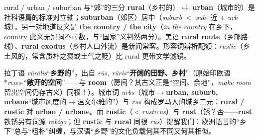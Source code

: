 \documentclass[../main.tex]{subfiles}
\begin{document}


\begin{gram}{rural / urban / suburban 与“郊”的三分}
\textbf{rural}（乡村的）$\leftrightarrow$ \textbf{urban}（城市的）是社科语篇的标准对立轴；\textbf{suburban}（郊区）居中（\textit{suburb} $<$ \textit{sub-} 近 + \textit{urb} 城）。另一对地道反义是 \textbf{the country / the city}（\textit{in the country} 在乡下，country 此义无冠词不可数，与“国家”义判然两分）。美语 \textbf{rural route}（乡邮路线）、\textbf{rural exodus}（乡村人口外流）是新闻常客。形容词辨析配额：\textit{rustic}（乡土风的，常含质朴之褒或土气之贬）比 rural 更带文学滤镜。
\end{gram}

\begin{origin}
拉丁语 \textit{rūrālis}“\textbf{乡野的}”，出自 \textit{rūs, rūris}“\textbf{开阔的田野、乡村}”（原始印欧语 *\textit{rewə-}“\textbf{敞开的空间}”——与 \textbf{room}（房间？其古义正是“空间、余地”，\textit{make room} 留出空间仍存古义）同根！）。城市词 \textit{urbs}（城市$\to$\textbf{urban, suburb, urbane}“城市风度的$\to$温文尔雅的”）与 \textit{rūs} 构成罗马人的城乡二元：\textbf{rural / rustic} 对 \textbf{urban / urbane}。而 \textbf{rustic}（$<$\textit{rusticus}）与 \textbf{rust}（锈？否——\textbf{rust} 铁锈另有词源 \textit{robigo}；但 \textbf{rustic} 与 \textbf{rural} 同根 \textit{rūs}）提醒我们：欧洲语言的“乡下”总与“粗朴”纠缠，与汉语“乡野”的文化负载何其不同又何其相似。
\end{origin}
\end{document}
